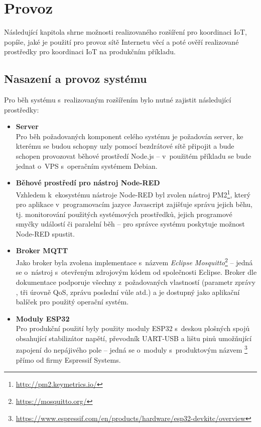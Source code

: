 \chapter{Provoz}
\label{ch:provoz}

Následující kapitola shrne možnosti realizovaného rozšíření pro koordinaci IoT, popíše, jaké je použití pro provoz
sítě Internetu věcí a poté ověří realizované prostředky pro koordinaci IoT na produkčním příkladu.

\section{Nasazení a provoz systému}\label{sec:nasazení-a-provoz-systému}
Pro běh systému s~realizovaným rozšířením bylo nutné zajistit následující prostředky:
\begin{itemize}
    \item \textbf{Server} \\
    Pro běh požadovaných komponent celého systému je požadován server, ke kterému se budou schopny uzly pomocí
    bezdrátové sítě připojit a bude schopen provozovat běhové prostředí Node.js -- v~použitém příkladu se bude jednat
    o~VPS s~operačním systémem Debian.

    \item \textbf{Běhové prostředí pro nástroj Node-RED} \\
    Vzhledem k~ekosystému nástroje Node-RED byl zvolen nástroj PM2\footnote{\url{http://pm2.keymetrics.io/}}, který pro
    aplikace v~programovacím jazyce Javascript zajišťuje správu jejich běhu, tj. monitorování použitých systémových
    prostředků, jejich programové smyčky událostí či paralelní běh -- pro správce systému poskytuje možnost Node-RED
    spustit.

    \item \textbf{Broker MQTT} \\
    Jako broker byla zvolena implementace s~názvem \emph{Eclipse Mosquitto}\footnote{\url{https://mosquitto.org/}} --
    jedná se o~nástroj s~otevřeným zdrojovým kódem od společnosti Eclipse.
    Broker dle dokumentace podporuje všechny z~požadovaných vlastností (parametr zprávy , tři úrovně QoS,
    zprávu poslední vůle atd.) a je dostupný jako aplikační balíček pro použitý operační systém.

    \item \textbf{Moduly ESP32} \\
    Pro produkční použití byly použity moduly ESP32 s~deskou plošných spojů obsahující stabilizátor napětí, převodník
    UART-USB a lištu pinů umožňující zapojení do nepájivého pole -- jedná se o~moduly s~produktovým názvem
    \footnote{\url{https://www.espressif.com/en/products/hardware/esp32-devkitc/overview}}
    přímo od firmy Espressif Systems.
\end{itemize}

